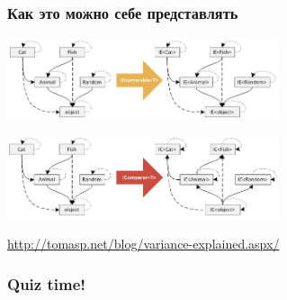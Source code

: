 \documentclass{../../slides-style}
\begin{document}
    \begin{frame}
        \frametitle{Как это можно себе представлять}
        \begin{center}
            \includegraphics[width=0.6\textwidth]{covariantFunctors.png}

            \vspace{4mm}
            \includegraphics[width=0.6\textwidth]{contravariantFunctors.png}
        \end{center}
            
        \url{http://tomasp.net/blog/variance-explained.aspx/}
    \end{frame}

    \begin{frame}
        \frametitle{Quiz time!}
    \end{frame}
\end{document}
